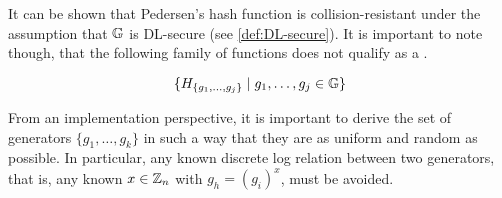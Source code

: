 It can be shown that Pedersen’s  hash  function  is  collision-resistant under the assumption that $\mathbb{G}$ is DL-secure (see \secname \ref{def:DL-secure}). It is important to note though, that the following family of functions does not qualify as a .

\begin{equation}
\label{Pedersen_not_pseudorandom}
\{H_{\{g_1,\ldots,g_j\}}\;|\;g_1,\ldots,g_j\in \mathbb{G}\}
\end{equation}

From an implementation perspective, it is important to derive the set of generators $\{g_1,\ldots,g_k\}$ in such a way that they are as uniform and random as possible. In particular, any known discrete log relation between two generators, that is, any known $x\in \mathbb{Z}_n$ with $g_h = (g_i)^x$, must be avoided.

